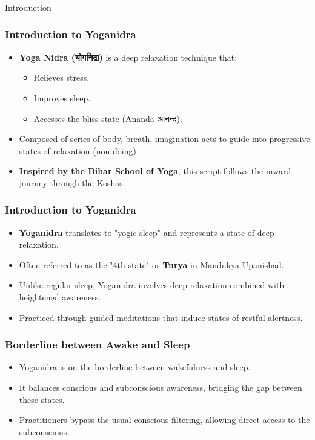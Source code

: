 \begin{frame}[fragile]\frametitle{}
\begin{center}
{\Large Introduction}
\end{center}
\end{frame}


\begin{frame}[fragile]\frametitle{Introduction to Yoganidra}
	\begin{itemize}
		\item \textbf{Yoga Nidra (योगनिद्रा)} is a deep relaxation technique that:
			\begin{itemize}
				\item Relieves stress.
				\item Improves sleep.
				\item Accesses the bliss state (Ananda आनन्द).
			\end{itemize}
	\item Composed of series of body, breath, imagination acts to guide into progressive states of relaxation (non-doing)
    \item \textbf{Inspired by the Bihar School of Yoga}, this script follows the inward journey through the Koshas.
	\end{itemize}
	
\end{frame}

\begin{frame}[fragile]\frametitle{Introduction to Yoganidra}
    \begin{itemize}
        \item \textbf{Yoganidra} translates to "yogic sleep" and represents a state of deep relaxation.
        \item Often referred to as the "4th state" or \textbf{Turya} in Mandukya Upanishad.
        \item Unlike regular sleep, Yoganidra involves deep relaxation combined with heightened awareness.
        \item Practiced through guided meditations that induce states of restful alertness.
    \end{itemize}
\end{frame}

\begin{frame}[fragile]\frametitle{Borderline between Awake and Sleep}
    \begin{itemize}
        \item Yoganidra is on the borderline between wakefulness and sleep.
        \item It balances conscious and subconscious awareness, bridging the gap between these states.
        \item Practitioners bypass the usual conscious filtering, allowing direct access to the subconscious.
    \end{itemize}
\end{frame}


